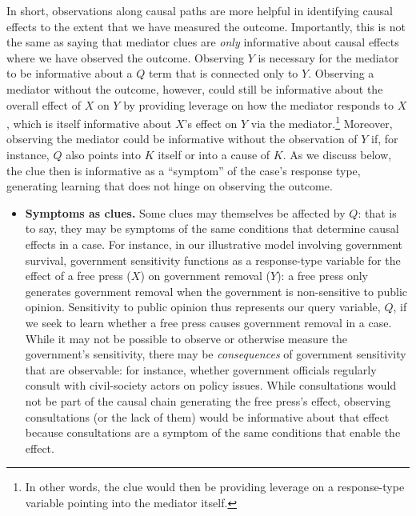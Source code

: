 \documentclass[
  12pt,
]{book}
\providecommand{\tightlist}{%
  \setlength{\itemsep}{0pt}\setlength{\parskip}{0pt}}
\begin{document}
In short, observations along causal paths are more helpful in identifying causal effects to the extent that we have measured the outcome. Importantly, this is not the same as saying that mediator clues are \emph{only} informative about causal effects where we have observed the outcome. Observing \(Y\) is necessary for the mediator to be informative about a \(Q\) term that is connected only to \(Y\). Observing a mediator without the outcome, however, could still be informative about the overall effect of \(X\) on \(Y\) by providing leverage on how the mediator responds to \(X\), which is itself informative about \(X\)'s effect on \(Y\) via the mediator.\footnote{In other words, the clue would then be providing leverage on a response-type variable pointing into the mediator itself.} Moreover, observing the mediator could be informative without the observation of \(Y\) if, for instance, \(Q\) also points into \(K\) itself or into a cause of \(K\). As we discuss below, the clue then is informative as a ``symptom'' of the case's response type, generating learning that does not hinge on observing the outcome.

\begin{itemize}
\tightlist
\item
  \textbf{Symptoms as clues.} Some clues may themselves be affected by \(Q\): that is to say, they may be symptoms of the same conditions that determine causal effects in a case. For instance, in our illustrative model involving government survival, government sensitivity functions as a response-type variable for the effect of a free press (\(X\)) on government removal (\(Y\)): a free press only generates government removal when the government is non-sensitive to public opinion. Sensitivity to public opinion thus represents our query variable, \(Q\), if we seek to learn whether a free press causes government removal in a case. While it may not be possible to observe or otherwise measure the government's sensitivity, there may be \emph{consequences} of government sensitivity that are observable: for instance, whether government officials regularly consult with civil-society actors on policy issues. While consultations would not be part of the causal chain generating the free press's effect, observing consultations (or the lack of them) would be informative about that effect because consultations are a symptom of the same conditions that enable the effect.
\end{itemize}
\end{document}

